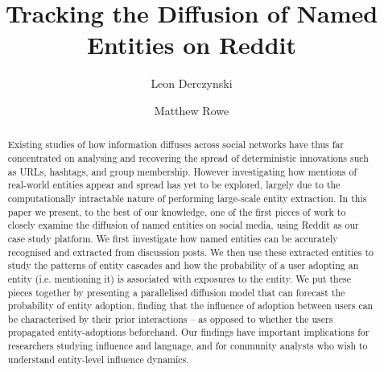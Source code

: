 \documentclass[acmsmall]{acmart}
\begin{document}
\title{Tracking the Diffusion of Named Entities on Reddit}


\author{Leon Derczynski}

\author{Matthew Rowe}




\begin{abstract}
Existing studies of how information diffuses across social networks have thus far concentrated on analysing and recovering the spread of deterministic innovations such as URLs, hashtags, and group membership.
However investigating how mentions of real-world entities appear and spread has yet to be explored, largely due to the computationally intractable nature of performing large-scale entity extraction.
In this paper we present, to the best of our knowledge, one of the first pieces of work to closely examine the diffusion of named entities on social media, using Reddit as our case study platform.
We first investigate how named entities can be accurately recognised and extracted from discussion posts. %
We then use these extracted entities to study the patterns of entity cascades and how the probability of a user adopting an entity (i.e. mentioning it) is associated with exposures to the entity.
We put these pieces together by presenting a parallelised diffusion model that can forecast the probability of entity adoption, finding that the influence of adoption between users can be characterised by their prior interactions -- as opposed to whether the users propagated entity-adoptions beforehand.
Our findings have important implications for researchers studying influence and language, and for community analysts who wish to understand entity-level influence dynamics.
\end{abstract}




\maketitle

\end{document}
